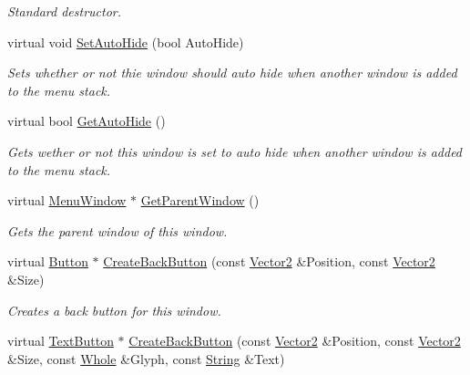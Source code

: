 \begin{DoxyCompactItemize}
\begin{DoxyCompactList}\small\item\em Standard destructor. \item\end{DoxyCompactList}\item 
virtual void \hyperlink{classphys_1_1UI_1_1MenuWindow_ac531ecb7994c9f7718a36f57c85db1b1}{SetAutoHide} (bool AutoHide)
\begin{DoxyCompactList}\small\item\em Sets whether or not thie window should auto hide when another window is added to the menu stack. \item\end{DoxyCompactList}\item 
virtual bool \hyperlink{classphys_1_1UI_1_1MenuWindow_ab7210297e9bf76bea6e0e610ab266eed}{GetAutoHide} ()
\begin{DoxyCompactList}\small\item\em Gets wether or not this window is set to auto hide when another window is added to the menu stack. \item\end{DoxyCompactList}\item 
virtual \hyperlink{classphys_1_1UI_1_1MenuWindow}{MenuWindow} $\ast$ \hyperlink{classphys_1_1UI_1_1MenuWindow_ac47ccc564f09ac33e13e56860b6ae281}{GetParentWindow} ()
\begin{DoxyCompactList}\small\item\em Gets the parent window of this window. \item\end{DoxyCompactList}\item 
virtual \hyperlink{classphys_1_1UI_1_1Button}{Button} $\ast$ \hyperlink{classphys_1_1UI_1_1MenuWindow_a508ff7f6bae6d8b42672b5ad8bc0705b}{CreateBackButton} (const \hyperlink{classphys_1_1Vector2}{Vector2} \&Position, const \hyperlink{classphys_1_1Vector2}{Vector2} \&Size)
\begin{DoxyCompactList}\small\item\em Creates a back button for this window. \item\end{DoxyCompactList}\item 
virtual \hyperlink{classphys_1_1UI_1_1TextButton}{TextButton} $\ast$ \hyperlink{classphys_1_1UI_1_1MenuWindow_a3dfd8d8ab4e07f75425ec35f140e4590}{CreateBackButton} (const \hyperlink{classphys_1_1Vector2}{Vector2} \&Position, const \hyperlink{classphys_1_1Vector2}{Vector2} \&Size, const \hyperlink{namespacephys_a460f6bc24c8dd347b05e0366ae34f34a}{Whole} \&Glyph, const \hyperlink{namespacephys_aa03900411993de7fbfec4789bc1d392e}{String} \&Text)

\end{DoxyCompactItemize}
